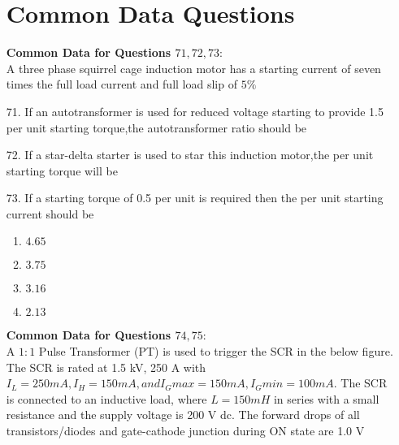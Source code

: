 \documentclass[journal,12pt,onecolumn]{IEEEtran}
\theoremstyle{remark}
\begin{document}
\begin{enumerate}
\section{Common Data Questions}
\textbf{Common Data for Questions $71,72,73:$} \\
A three phase squirrel cage induction motor has a starting current of seven times the full load current and full load slip of $5\%$

    \item [71.] If an autotransformer is used for reduced voltage starting to provide 1.5 per unit starting torque,the autotransformer ratio \brak{\%} should be
        \begin{enumerate}    
       \end{enumerate}
    \item  [72.] If a star-delta starter is used to star this induction motor,the per unit starting torque will be
        \begin{enumerate}
               \end{enumerate}

    \item [73.]If a starting torque of 0.5 per unit is required then the per unit starting current should be 
        \begin{multicols}{4}
            \begin{enumerate}
                \item $4.65$ 
                \item $3.75$ 
                \item $3.16$
                \item $2.13$
            \end{enumerate}
        \end{multicols}
\textbf{Common Data for Questions $74,75:$} \\    
   A $1:1$ Pulse Transformer (PT) is used to trigger the SCR in the below figure. The SCR is rated at 1.5 kV, 250 A with $I_L=250 mA, I_H=150 mA, and I_Gmax=150 mA, I_Gmin=100 mA$. The SCR is connected to an inductive load, where $L = 150 mH$ in series with a small resistance and the supply voltage is 200 V dc. The forward drops of all transistors/diodes and gate-cathode junction during ON state are 1.0 V 
   

\end{enumerate}
\end{document}
